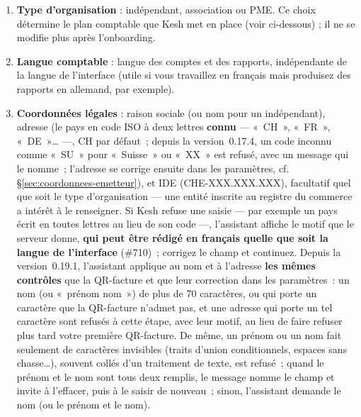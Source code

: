 \documentclass[a4paper,11pt,oneside]{article}
\begin{document}
\begin{enumerate}
    \item \textbf{Type d'organisation} : indépendant, association ou PME. Ce choix détermine le plan comptable que Kesh met en place (voir ci-dessous) ; il ne se modifie plus après l'onboarding.
    \item \textbf{Langue comptable} : langue des comptes et des rapports, indépendante de la langue de l'interface (utile si vous travaillez en français mais produisez des rapports en allemand, par exemple).
    \item \textbf{Coordonnées légales} : raison sociale (ou nom pour un indépendant), adresse (le pays en code ISO à deux lettres \textbf{connu} --- «~CH~», «~FR~», «~DE~»… ---, CH par défaut~; depuis la version~0.17.4, un code inconnu comme «~SU~» pour «~Suisse~» ou «~XX~» est refusé, avec un message qui le nomme~; l'adresse se corrige ensuite dans les paramètres, cf. \S\ref{sec:coordonnees-emetteur}), et IDE (CHE-XXX.XXX.XXX), facultatif quel que soit le type d'organisation --- une entité inscrite au registre du commerce a intérêt à le renseigner. Si Kesh refuse une saisie --- par exemple un pays écrit en toutes lettres au lieu de son code ---, l'assistant affiche le motif que le serveur donne, \textbf{qui peut être rédigé en français quelle que soit la langue de l'interface} (\#710)~; corrigez le champ et continuez. Depuis la version~0.19.1, l'assistant applique au nom et à l'adresse \textbf{les mêmes contrôles} que la QR-facture et que leur correction dans les paramètres~: un nom (ou «~prénom nom~») de plus de 70 caractères, ou qui porte un caractère que la QR-facture n'admet pas, et une adresse qui porte un tel caractère sont refusés à cette étape, avec leur motif, au lieu de faire refuser plus tard votre première QR-facture. De même, un prénom ou un nom fait seulement de caractères invisibles (traits d'union conditionnels, espaces sans chasse…), souvent collés d'un traitement de texte, est refusé~; quand le prénom et le nom sont tous deux remplis, le message nomme le champ et invite à l'effacer, puis à le saisir de nouveau~; sinon, l'assistant demande le nom (ou le prénom et le nom).

\end{enumerate}
\end{document}
